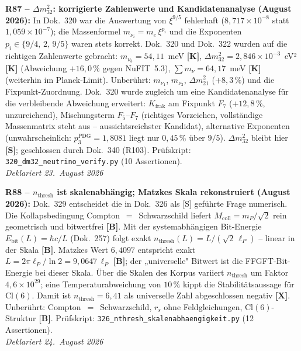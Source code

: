 \textbf{R87 -- $\Delta m_{32}^2$: korrigierte Zahlenwerte und Kandidatenanalyse (August 2026):}
In Dok.~320 war die Auswertung von $\xi^{9/5}$ fehlerhaft ($8{,}717\times10^{-8}$ statt
$1{,}059\times10^{-7}$); die Massenformel $m_{\nu_i} = m_e\,\xi^{p_i}$ und die Exponenten
$p_i \in \{9/4,\,2,\,9/5\}$ waren stets korrekt. Dok.~320 und Dok.~322 wurden auf die
richtigen Zahlenwerte gebracht: $m_{\nu_3} = 54{,}11$~meV \textbf{[K]},
$\Delta m_{32}^2 = 2{,}846\times10^{-3}$~eV² \textbf{[K]} (Abweichung $+16{,}0\,\%$ gegen
NuFIT~5.3), $\sum m_\nu = 64{,}17$~meV \textbf{[K]} (weiterhin im Planck-Limit).
Unberührt: $m_{\nu_1}$, $m_{\nu_2}$, $\Delta m_{21}^2$ ($+8{,}3\,\%$) und die
Fixpunkt-Zuordnung. Dok.~320 wurde zugleich um eine Kandidatenanalyse für die
verbleibende Abweichung erweitert: $K_{\mathrm{frak}}$ am Fixpunkt $F_7$ ($+12{,}8\,\%$,
unzureichend), Mischungsterm $F_5$--$F_7$ (richtiges Vorzeichen, vollständige
Massenmatrix steht aus -- aussichtsreichster Kandidat), alternative Exponenten
(unwahrscheinlich: $p_3^{\mathrm{PDG}} = 1{,}8081$ liegt nur $0{,}45\,\%$ über $9/5$).
$\Delta m_{32}^2$ bleibt hier \textbf{[S]}; geschlossen durch Dok.~340 (R103).
Prüfskript: \texttt{320\_dm32\_neutrino\_verify.py} (10 Assertionen).\\
\emph{Deklariert 23.~August 2026}

\medskip

\textbf{R88 -- $n_{\mathrm{thresh}}$ ist skalenabhängig; Matzkes Skala rekonstruiert (August 2026):}
Dok.~329 entscheidet die in Dok.~326 als [S] geführte Frage numerisch.
Die Kollapsbedingung Compton~$=$~Schwarzschild liefert $M_{\mathrm{coll}} = m_P/\sqrt{2}$ rein geometrisch und bitwertfrei \textbf{[B]}.
Mit der systemabhängigen Bit-Energie $E_{\mathrm{bit}}(L) = \hbar c/L$ (Dok.~257) folgt exakt $n_{\mathrm{thresh}}(L) = L/(\sqrt{2}\,\ell_P)$ -- linear in der Skala \textbf{[B]}.
Matzkes Wert $6{,}4097$ entspricht exakt $L = 2\pi\ell_P/\ln 2 = 9{,}0647\,\ell_P$ \textbf{[B]}; der „universelle" Bitwert ist die FFGFT-Bit-Energie bei dieser Skala.
Über die Skalen des Korpus variiert $n_{\mathrm{thresh}}$ um Faktor $4{,}6\times10^{29}$; eine Temperaturabweichung von $10\,\%$ kippt die Stabilitätsaussage für $\mathrm{Cl}(6)$.
Damit ist $n_{\mathrm{thresh}} = 6{,}41$ als universelle Zahl abgeschlossen negativ \textbf{[X]}.
Unberührt: Compton~$=$~Schwarzschild, $r_s$ ohne Feldgleichungen, $\mathrm{Cl}(6)$-Struktur \textbf{[B]}.
Prüfskript: \texttt{326\_nthresh\_skalenabhaengigkeit.py} (12 Assertionen).\\
\emph{Deklariert 24.~August 2026}

